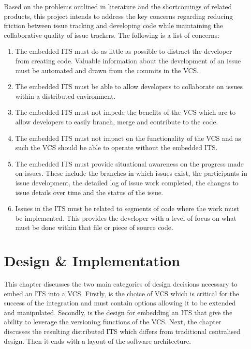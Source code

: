 \documentclass{mproj}
\begin{document}
Based on the problems outlined in literature and the shortcomings of related products, this project intends to address the key concerns regarding reducing friction between issue tracking and developing code while maintaining the collaborative quality of issue trackers. The following is a list of concerns:

\begin{enumerate}
  \item The embedded ITS must do as little as possible to distract the developer from creating code. Valuable information about the development of an issue must be automated and drawn from the commits in the VCS.
  \item The embedded ITS must be able to allow developers to collaborate on issues within a distributed environment.
  \item The embedded ITS must not impede the benefits of the VCS which are to allow developers to easily branch, merge and contribute to the code.
  \item The embedded ITS must not impact on the functionality of the VCS and as such the VCS should be able to operate without the embedded ITS.
  \item The embedded ITS must provide situational awareness on the progress made on issues. These include the branches in which issues exist, the participants in issue development, the detailed log of issue work completed, the changes to issue details over time and the status of the issue.
  \item Issues in the ITS must be related to segments of code where the work must be implemented. This provides the developer with a level of focus on what must be done within that file or piece of source code.
\end{enumerate}



\chapter{Design {\&} Implementation}\label{design}

This chapter discusses the two main categories of design decisions necessary to embed an ITS into a VCS. Firstly, is the choice of VCS which is critical for the success of the integration and must contain options allowing it to be extended and manipulated. Secondly, is the design for embedding an ITS that give the ability to leverage the versioning functions of the VCS. Next, the chapter discusses the resulting distributed ITS which differs from traditional centralised design. Then it ends with a layout of the software architecture.
\end{document}
